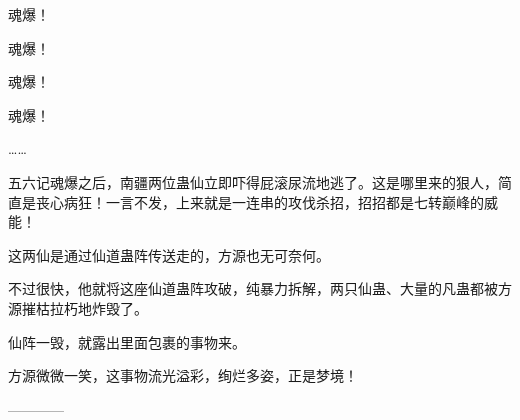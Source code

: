 \begin{this_body}
魂爆！

魂爆！

魂爆！

魂爆！

……

五六记魂爆之后，南疆两位蛊仙立即吓得屁滚尿流地逃了。这是哪里来的狠人，简直是丧心病狂！一言不发，上来就是一连串的攻伐杀招，招招都是七转巅峰的威能！

这两仙是通过仙道蛊阵传送走的，方源也无可奈何。

不过很快，他就将这座仙道蛊阵攻破，纯暴力拆解，两只仙蛊、大量的凡蛊都被方源摧枯拉朽地炸毁了。

仙阵一毁，就露出里面包裹的事物来。

方源微微一笑，这事物流光溢彩，绚烂多姿，正是梦境！

------------

\end{this_body}

